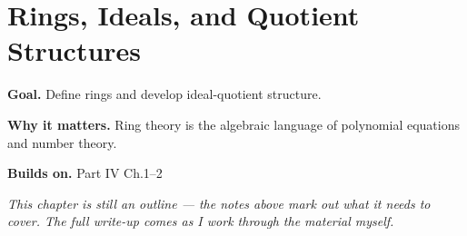 \chapter{Rings, Ideals, and Quotient Structures}
\label{ch:04-abstract-algebra-04}

\begin{chapterintro}
\textbf{Goal.} Define rings and develop ideal-quotient structure.

\textbf{Why it matters.} Ring theory is the algebraic language of polynomial equations and number theory.

\textbf{Builds on.} Part IV Ch.1–2
\end{chapterintro}

\textit{This chapter is still an outline --- the notes above mark out what it needs to cover. The full write-up comes as I work through the material myself.}
